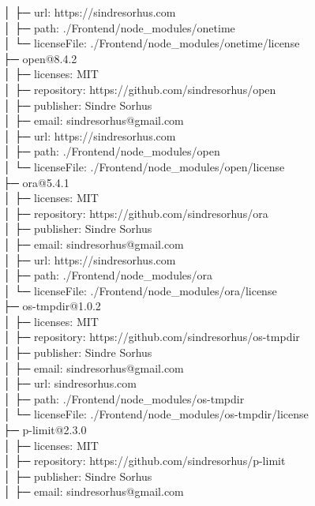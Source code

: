 \documentclass[
    paper=a4,
    twoside=false,
    parskip=half,
    listof=entryprefix,
    listof=totoc,
    index=totoc,
    bibliography=totoc,
    headsepline,
]{scrbook}
\begin{document}
    │  ├─ url: https://sindresorhus.com\\
    │  ├─ path: ./Frontend/node\_modules/onetime\\
    │  └─ licenseFile: ./Frontend/node\_modules/onetime/license\\
    ├─ open@8.4.2\\
    │  ├─ licenses: MIT\\
    │  ├─ repository: https://github.com/sindresorhus/open\\
    │  ├─ publisher: Sindre Sorhus\\
    │  ├─ email: sindresorhus@gmail.com\\
    │  ├─ url: https://sindresorhus.com\\
    │  ├─ path: ./Frontend/node\_modules/open\\
    │  └─ licenseFile: ./Frontend/node\_modules/open/license\\
    ├─ ora@5.4.1\\
    │  ├─ licenses: MIT\\
    │  ├─ repository: https://github.com/sindresorhus/ora\\
    │  ├─ publisher: Sindre Sorhus\\
    │  ├─ email: sindresorhus@gmail.com\\
    │  ├─ url: https://sindresorhus.com\\
    │  ├─ path: ./Frontend/node\_modules/ora\\
    │  └─ licenseFile: ./Frontend/node\_modules/ora/license\\
    ├─ os-tmpdir@1.0.2\\
    │  ├─ licenses: MIT\\
    │  ├─ repository: https://github.com/sindresorhus/os-tmpdir\\
    │  ├─ publisher: Sindre Sorhus\\
    │  ├─ email: sindresorhus@gmail.com\\
    │  ├─ url: sindresorhus.com\\
    │  ├─ path: ./Frontend/node\_modules/os-tmpdir\\
    │  └─ licenseFile: ./Frontend/node\_modules/os-tmpdir/license\\
    ├─ p-limit@2.3.0\\
    │  ├─ licenses: MIT\\
    │  ├─ repository: https://github.com/sindresorhus/p-limit\\
    │  ├─ publisher: Sindre Sorhus\\
    │  ├─ email: sindresorhus@gmail.com\\
\end{document}
